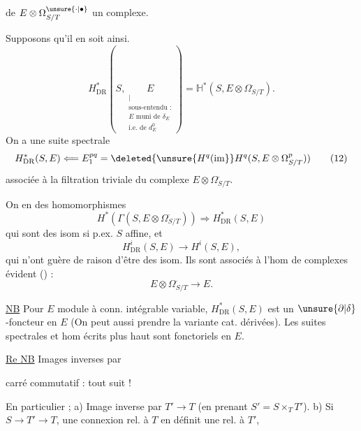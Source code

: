 de $E\otimes\Omega^{\unsure{\cdot|\bullet}}_{S/T}$ un complexe.

Supposons qu'il en soit ainsi. 
\[
H^*_{\mathrm{DR}}(S,\underset{\substack{|\\\text{sous-entendu :}\\ E\text{ muni de }\delta_E\\
\text{i.e. de }d_E^0}}{E})=\mathbb H^*(S,E\otimes\Omega^{\cdot}_{S/T}). \tag*{(11)}
\]
On a une suite spectrale
\[
H^*_{\mathrm{DR}}(S,E)\Longleftarrow E_1^{pq}=
\deleted{\unsure{H^q(\mathrm{im}}}H^q(S,E\otimes\Omega^p_{S/T})) \tag*{(12)}
\]
associée à la filtration triviale du complexe $E\otimes\Omega^{\cdot}_{S/T}$.

On en  des  homomorphismes
\[
H^*(\Gamma(S,E\otimes\Omega^{\cdot}_{S/T}))\Longrightarrow H^*_{\mathrm{DR}}(S,E) \tag*{(13)}
\]
qui sont des isom si p.ex. $S$ affine, et
\[
H^i_{\mathrm{DR}}(S,E)\longrightarrow H^i(S,E), \tag*{(14)}
\]
qui n'ont guère de raison d'être des isom. Ils sont
associés à l'hom de complexes évident () :
\[
E\otimes\Omega^{\cdot}_{S/T}\longrightarrow E. \tag*{(15)}
\]

\uline{NB} Pour $E$ module à conn. intégrable variable,
$H^*_{\mathrm{DR}}(S,E)$ est un $\unsure{\partial|\delta}$-foncteur en $E$ (On peut aussi
prendre la variante cat. dérivées). Les suites spectrales
et hom écrits plus haut sont fonctoriels en $E$.

\uline{Re NB} Images inverses  par


carré commutatif :
tout suit \unsure{\ldots} !

En particulier ;  a) Image inverse par $T'\longrightarrow T$
(en prenant $S'=S\times_T T'$). b) Si $S\longrightarrow T'\longrightarrow T$, une
connexion rel. à $T$ en définit une rel. à $T'$, 
